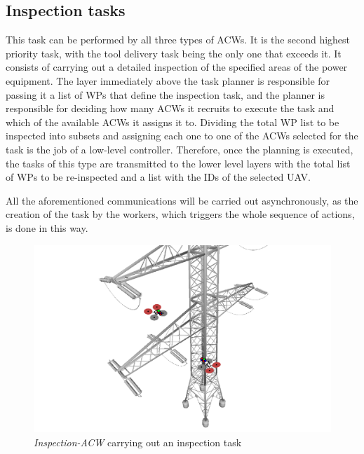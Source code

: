 \subsection{Inspection tasks}
\label{subsec:InspectionTasks}
This task can be performed by all three types of \glspl{ACW}. It is the second highest priority task, with the tool delivery task being the only one that exceeds it. It consists of carrying out a detailed inspection of the specified areas of the power equipment. The layer immediately above the task planner is responsible for passing it a list of \glspl{WP} that define the inspection task, and the planner is responsible for deciding how many \glspl{ACW} it recruits to execute the task and which of the available \glspl{ACW} it assigns it to. Dividing the total \gls{WP} list to be inspected into subsets and assigning each one to one of the \glspl{ACW} selected for the task is the job of a low-level controller. Therefore, once the planning is executed, the tasks of this type are transmitted to the lower level layers with the total list of \glspl{WP} to be re-inspected and a list with the \glspl{ID} of the selected \gls{UAV}.

All the aforementioned communications will be carried out asynchronously, as the creation of the task by the workers, which triggers the whole sequence of actions, is done in this way.

\begin{figure}[htbp]
    \centering
    \includegraphics[width=.75\linewidth]
    {ProblemFormulation/figures/inspection_task.pdf}
    \caption{\textit{Inspection-ACW} carrying out an inspection task}
    \label{fig:inspection_task}
\end{figure}

